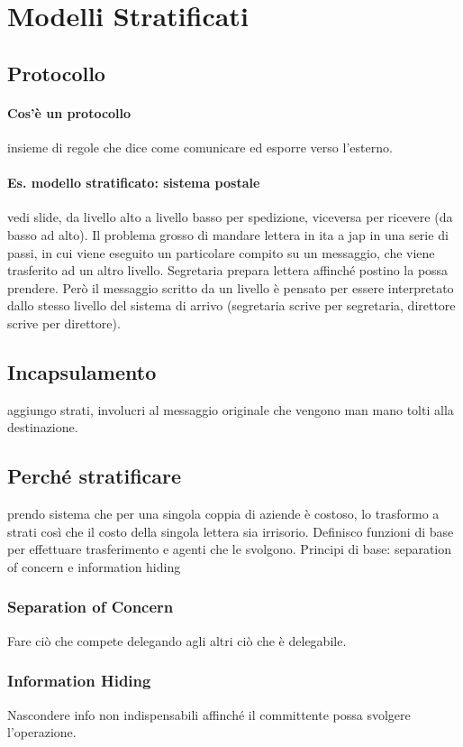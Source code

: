 \documentclass[10pt]{article}
\begin{document}
\section{Modelli Stratificati}
\subsection{Protocollo}
\paragraph{Cos'è un protocollo} insieme di regole che dice come comunicare ed esporre verso l'esterno.
\paragraph{Es. modello stratificato: sistema postale} vedi slide, da livello alto a livello basso per spedizione, viceversa per ricevere (da basso ad alto). Il problema grosso di mandare lettera in ita a jap in una serie di passi, in cui viene eseguito un particolare compito su un messaggio, che viene trasferito ad un altro livello. Segretaria prepara lettera affinché postino la possa prendere. Però il messaggio scritto da un livello è pensato per essere interpretato dallo stesso livello del sistema di arrivo (segretaria scrive per segretaria, direttore scrive per direttore).
\subsection{Incapsulamento} aggiungo strati, involucri al messaggio originale che vengono man mano tolti alla destinazione.
\subsection{Perché stratificare} prendo sistema che per una singola coppia di aziende è costoso, lo trasformo a strati così che il costo della singola lettera sia irrisorio.
Definisco funzioni di base per effettuare trasferimento e agenti che le svolgono.
Principi di base: separation of concern e information hiding
\subsubsection{Separation of Concern}
Fare ciò che compete delegando agli altri ciò che è delegabile.
\subsubsection{Information Hiding}
Nascondere info non indispensabili affinché il committente possa svolgere l'operazione.
\end{document}
